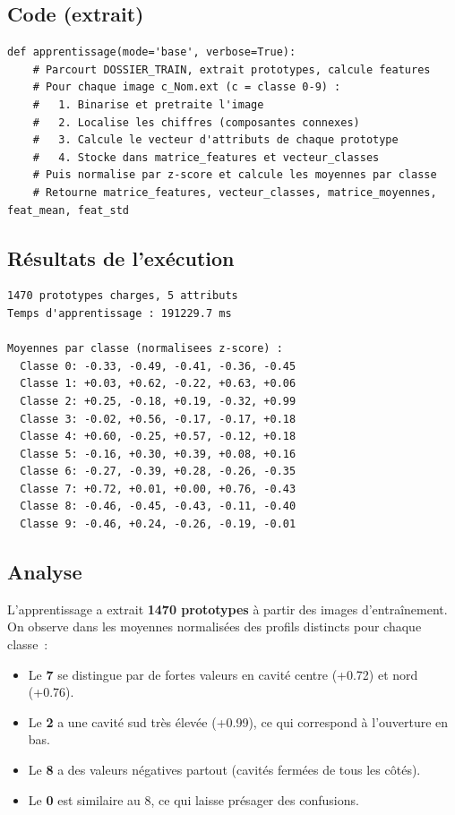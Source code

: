 \documentclass[a4paper,11pt]{article}
\begin{document}
\subsection{Code (extrait)}

\begin{lstlisting}[style=python, caption={Fonction d'apprentissage (structure principale).}]
def apprentissage(mode='base', verbose=True):
    # Parcourt DOSSIER_TRAIN, extrait prototypes, calcule features
    # Pour chaque image c_Nom.ext (c = classe 0-9) :
    #   1. Binarise et pretraite l'image
    #   2. Localise les chiffres (composantes connexes)
    #   3. Calcule le vecteur d'attributs de chaque prototype
    #   4. Stocke dans matrice_features et vecteur_classes
    # Puis normalise par z-score et calcule les moyennes par classe
    # Retourne matrice_features, vecteur_classes, matrice_moyennes, feat_mean, feat_std
\end{lstlisting}

\subsection{Résultats de l'exécution}

\begin{lstlisting}[style=output, caption={Sortie de l'apprentissage (mode base).}]
1470 prototypes charges, 5 attributs
Temps d'apprentissage : 191229.7 ms

Moyennes par classe (normalisees z-score) :
  Classe 0: -0.33, -0.49, -0.41, -0.36, -0.45
  Classe 1: +0.03, +0.62, -0.22, +0.63, +0.06
  Classe 2: +0.25, -0.18, +0.19, -0.32, +0.99
  Classe 3: -0.02, +0.56, -0.17, -0.17, +0.18
  Classe 4: +0.60, -0.25, +0.57, -0.12, +0.18
  Classe 5: -0.16, +0.30, +0.39, +0.08, +0.16
  Classe 6: -0.27, -0.39, +0.28, -0.26, -0.35
  Classe 7: +0.72, +0.01, +0.00, +0.76, -0.43
  Classe 8: -0.46, -0.45, -0.43, -0.11, -0.40
  Classe 9: -0.46, +0.24, -0.26, -0.19, -0.01
\end{lstlisting}

\subsection{Analyse}

L'apprentissage a extrait \textbf{1470 prototypes} à partir des images d'entraînement. On observe dans les moyennes normalisées des profils distincts pour chaque classe~:
\begin{itemize}
    \item Le \textbf{7} se distingue par de fortes valeurs en cavité centre (+0.72) et nord (+0.76).
    \item Le \textbf{2} a une cavité sud très élevée (+0.99), ce qui correspond à l'ouverture en bas.
    \item Le \textbf{8} a des valeurs négatives partout (cavités fermées de tous les côtés).
    \item Le \textbf{0} est similaire au 8, ce qui laisse présager des confusions.
\end{itemize}
\end{document}
